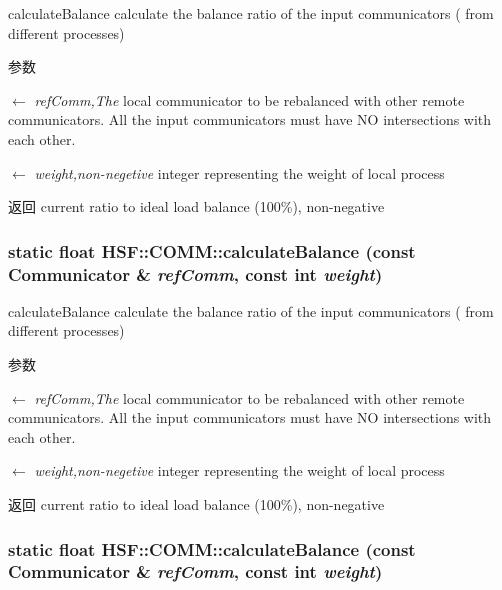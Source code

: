 calculateBalance calculate the balance ratio of the input communicators ( from different processes) 
\begin{DoxyParams}{参数}
\item[\mbox{$\leftarrow$} {\em refComm,The}]local communicator to be rebalanced with other remote communicators. All the input communicators must have NO intersections with each other. \item[\mbox{$\leftarrow$} {\em weight,non-\/negetive}]integer representing the weight of local process \end{DoxyParams}
\begin{DoxyReturn}{返回}
current ratio to ideal load balance (100\%), non-\/negative 
\end{DoxyReturn}
\hypertarget{classHSF_1_1COMM_aab59c2848eee97f010d9b50c3d3881b4}{
\subsubsection[{calculateBalance}]{\setlength{\rightskip}{0pt plus 5cm}static float HSF::COMM::calculateBalance (const {\bf Communicator} \& {\em refComm}, \/  const int {\em weight})}}
\label{classHSF_1_1COMM_aab59c2848eee97f010d9b50c3d3881b4}


calculateBalance calculate the balance ratio of the input communicators ( from different processes) 
\begin{DoxyParams}{参数}
\item[\mbox{$\leftarrow$} {\em refComm,The}]local communicator to be rebalanced with other remote communicators. All the input communicators must have NO intersections with each other. \item[\mbox{$\leftarrow$} {\em weight,non-\/negetive}]integer representing the weight of local process \end{DoxyParams}
\begin{DoxyReturn}{返回}
current ratio to ideal load balance (100\%), non-\/negative 
\end{DoxyReturn}
\hypertarget{classHSF_1_1COMM_aab59c2848eee97f010d9b50c3d3881b4}{
\subsubsection[{calculateBalance}]{\setlength{\rightskip}{0pt plus 5cm}static float HSF::COMM::calculateBalance (const {\bf Communicator} \& {\em refComm}, \/  const int {\em weight})}}
\label{classHSF_1_1COMM_aab59c2848eee97f010d9b50c3d3881b4}


